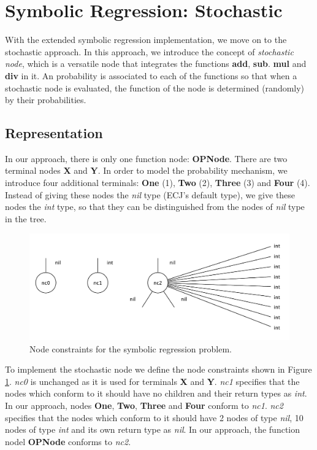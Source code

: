 \section{Symbolic Regression: Stochastic}
\label{sr_stochastic}
With the extended symbolic regression implementation, we move on to the stochastic approach. In this approach, we introduce the concept of \emph{stochastic node}, which is a versatile node that integrates the functions \textbf{add}, \textbf{sub}. \textbf{mul} and \textbf{div} in it. An probability is associated to each of the functions so that when a stochastic node is evaluated, the function of the node is determined (randomly) by their probabilities. 

\subsection{Representation}
In our approach, there is only one function node: \textbf{OPNode}. There are two terminal nodes \textbf{X} and \textbf{Y}. In order to model the probability mechanism, we introduce four additional terminals: \textbf{One} (1), \textbf{Two} (2), \textbf{Three} (3) and \textbf{Four} (4). Instead of giving these nodes the \emph{nil} type (ECJ's default type), we give these nodes the \emph{int} type, so that they can be distinguished from the nodes of \emph{nil} type in the tree. %
\begin{figure}
	\centering
	\includegraphics[width=1\linewidth]{./fig/symbolic_stochastic_ncs}
	\caption{Node constraints for the symbolic regression problem.}
	\label{fig:symb_stochastic_ncs}
\end{figure}

To implement the stochastic node we define the node constraints shown in Figure \ref{fig:symb_stochastic_ncs}. \emph{nc0} is unchanged as it is used for terminals \textbf{X} and \textbf{Y}. \emph{nc1} specifies that the nodes which conform to it should have no children and their return types as \emph{int}. In our approach, nodes \textbf{One}, \textbf{Two}, \textbf{Three} and \textbf{Four} conform to \emph{nc1}. \emph{nc2} specifies that the nodes which conform to it should have 2 nodes of type \emph{nil}, 10 nodes of type \emph{int} and its own return type as \emph{nil}. In our approach, the function nodel \textbf{OPNode} conforms to \emph{nc2}. 



